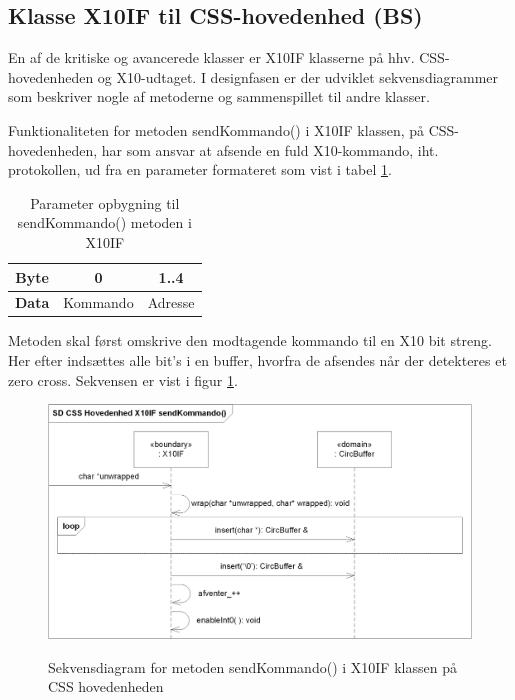\subsection{Klasse X10IF til CSS-hovedenhed (BS)}
En af de kritiske og avancerede klasser er X10IF klasserne på hhv. CSS-hovedenheden og X10-udtaget. I designfasen er der udviklet sekvensdiagrammer som beskriver nogle af metoderne og sammenspillet til andre klasser.

Funktionaliteten for metoden sendKommando() i X10IF klassen, på CSS-hovedenheden, har som ansvar at afsende en fuld X10-kommando, iht. protokollen, ud fra en parameter formateret som vist i tabel \ref{table:X10_sendKommando_format}.

\begin{table}[h]
	\caption{Parameter opbygning til sendKommando() metoden i X10IF}
	\centering
	\begin{tabular}{|c|c|c|}
		\hline 
		\textbf{Byte} & 0 & 1..4 \\ \hline
		\textbf{Data} & Kommando & Adresse \\ 
		\hline 
	\end{tabular} 
	\label{table:X10_sendKommando_format}
\end{table}

Metoden skal først omskrive den modtagende kommando til en X10 bit streng. Her efter indsættes alle bit's i en buffer, hvorfra de afsendes når der detekteres et zero cross. 
Sekvensen er vist i figur \ref{fig:X10_sendKommando_sd}.

\begin{figure}[!htb]
     {\includegraphics[width=\textwidth]{billeder/uml/CSS_X10IF_sendKommando_SD}}
     \caption{Sekvensdiagram for metoden sendKommando() i X10IF klassen på CSS hovedenheden}
     \label{fig:X10_sendKommando_sd}
\end{figure}

